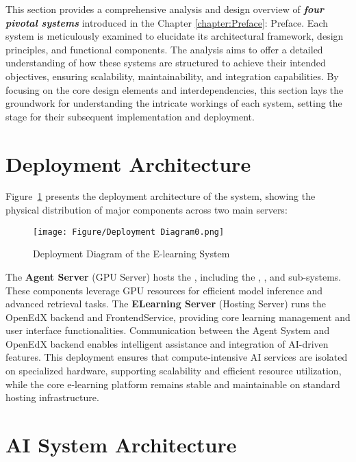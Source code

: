 \documentclass[../Main.tex]{subfiles}
\begin{document}
	This section provides a comprehensive analysis and design overview of \emph{\textbf{four
	pivotal systems}} introduced in the Chapter \ref{chapter:Preface}: Preface.
	Each system is meticulously examined to elucidate its architectural framework,
	design principles, and functional components. The analysis aims to offer a detailed
	understanding of how these systems are structured to achieve their intended objectives,
	ensuring scalability, maintainability, and integration capabilities. By focusing
	on the core design elements and interdependencies, this section lays the
	groundwork for understanding the intricate workings of each system, setting the
	stage for their subsequent implementation and deployment.
	
	\section{Deployment Architecture}
	\label{section:4.5_deployment_architecture} Figure~\ref{fig:Deployment_Diagram}
	presents the deployment architecture of the system, showing the physical distribution
	of major components across two main servers:

	\begin{figure}[H]
		\centering
		\texttt{[image: Figure/Deployment Diagram0.png]}
		\caption{Deployment Diagram of the E-learning System}
		\label{fig:Deployment_Diagram}
	\end{figure}

	The \textbf{Agent Server} (GPU Server) hosts the , including the
	, , and  sub-systems. These components
	leverage GPU resources for efficient model inference and advanced retrieval tasks.
	The \textbf{ELearning Server} (Hosting Server) runs the OpenEdX backend and FrontendService,
	providing core learning management and user interface functionalities. Communication
	between the Agent System and OpenEdX backend enables intelligent assistance and
	integration of AI-driven features. This deployment ensures that compute-intensive
	AI services are isolated on specialized hardware, supporting scalability and efficient
	resource utilization, while the core e-learning platform remains stable and
	maintainable on standard hosting infrastructure.
	
	\section{AI System Architecture}
	\label{section:4.1_ai_system_architecture}
\end{document}
